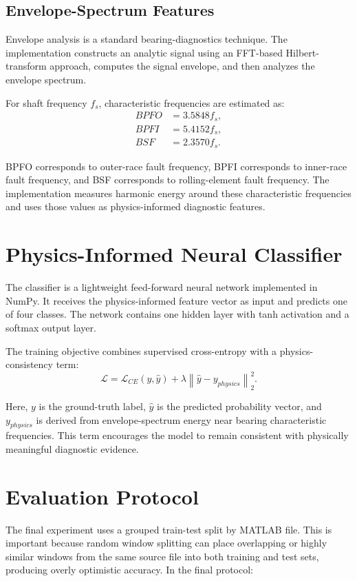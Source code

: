 \documentclass[11pt,a4paper]{article}
\begin{document}
\subsection{Envelope-Spectrum Features}
Envelope analysis is a standard bearing-diagnostics technique. The implementation constructs an analytic signal using an FFT-based Hilbert-transform approach, computes the signal envelope, and then analyzes the envelope spectrum.

For shaft frequency \(f_s\), characteristic frequencies are estimated as:
\[
\begin{aligned}
BPFO &= 3.5848 f_s,\\
BPFI &= 5.4152 f_s,\\
BSF  &= 2.3570 f_s.
\end{aligned}
\]

BPFO corresponds to outer-race fault frequency, BPFI corresponds to inner-race fault frequency, and BSF corresponds to rolling-element fault frequency. The implementation measures harmonic energy around these characteristic frequencies and uses those values as physics-informed diagnostic features.

\section{Physics-Informed Neural Classifier}
The classifier is a lightweight feed-forward neural network implemented in NumPy. It receives the physics-informed feature vector as input and predicts one of four classes. The network contains one hidden layer with tanh activation and a softmax output layer.

The training objective combines supervised cross-entropy with a physics-consistency term:
\[
\mathcal{L} = \mathcal{L}_{CE}(y,\hat{y}) + \lambda \left\lVert \hat{y} - y_{physics} \right\rVert_2^2.
\]

Here, \(y\) is the ground-truth label, \(\hat{y}\) is the predicted probability vector, and \(y_{physics}\) is derived from envelope-spectrum energy near bearing characteristic frequencies. This term encourages the model to remain consistent with physically meaningful diagnostic evidence.

\section{Evaluation Protocol}
The final experiment uses a grouped train-test split by MATLAB file. This is important because random window splitting can place overlapping or highly similar windows from the same source file into both training and test sets, producing overly optimistic accuracy. In the final protocol:
\end{document}
